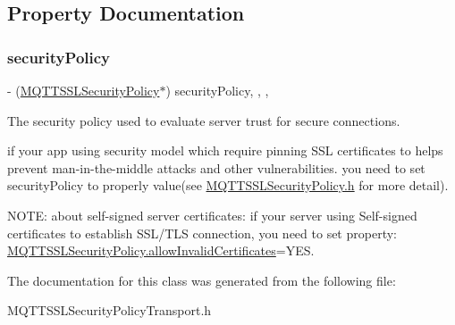 \subsection{Property Documentation}
\mbox{\label{interface_m_q_t_t_s_s_l_security_policy_transport_aad852e4a64b0134fd25c077733a6cd55}} 
\subsubsection{\texorpdfstring{security\+Policy}{securityPolicy}}
{\footnotesize\ttfamily -\/ (\hyperlink{interface_m_q_t_t_s_s_l_security_policy}{M\+Q\+T\+T\+S\+S\+L\+Security\+Policy}$\ast$) security\+Policy\hspace{0.3cm}{\ttfamily [read]}, {\ttfamily [write]}, {\ttfamily [nonatomic]}, {\ttfamily [strong]}}

The security policy used to evaluate server trust for secure connections.

if your app using security model which require pinning S\+SL certificates to helps prevent man-\/in-\/the-\/middle attacks and other vulnerabilities. you need to set security\+Policy to properly value(see \hyperlink{_m_q_t_t_s_s_l_security_policy_8h_source}{M\+Q\+T\+T\+S\+S\+L\+Security\+Policy.\+h} for more detail).

N\+O\+TE\+: about self-\/signed server certificates\+: if your server using Self-\/signed certificates to establish S\+S\+L/\+T\+LS connection, you need to set property\+: \hyperlink{interface_m_q_t_t_s_s_l_security_policy_a42fe688d550833a1f903be92b72cf384}{M\+Q\+T\+T\+S\+S\+L\+Security\+Policy.\+allow\+Invalid\+Certificates}=Y\+ES. 

The documentation for this class was generated from the following file\+:\begin{DoxyCompactItemize}
\item 
M\+Q\+T\+T\+S\+S\+L\+Security\+Policy\+Transport.\+h\end{DoxyCompactItemize}
